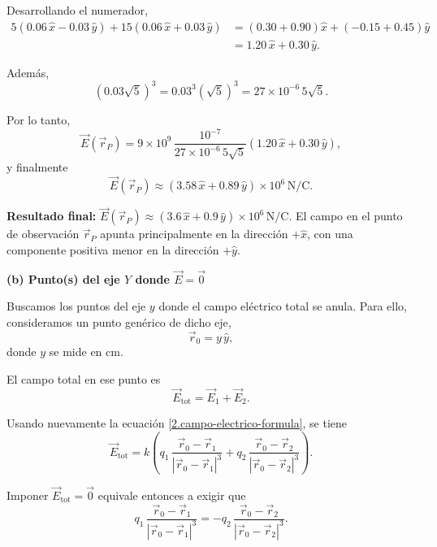 \documentclass[11pt]{article}
\newcommand{\resultadofinal}[1]{%
  \par\medskip
  \noindent\textbf{Resultado final:} #1\par
}
\begin{document}
Desarrollando el numerador,
\begin{align*}
5(0.06\,\hat x-0.03\,\hat y)
+
15(0.06\,\hat x+0.03\,\hat y)
&=
(0.30+0.90)\hat x+(-0.15+0.45)\hat y \\
&=
1.20\,\hat x+0.30\,\hat y.
\end{align*}

Además,
\begin{equation*}
(0.03\sqrt{5})^3
=
0.03^3(\sqrt{5})^3
=
27\times 10^{-6}\,5\sqrt{5}.
\end{equation*}

Por lo tanto,
\begin{equation*}
\vec E(\vec r_P)
=
9\times 10^9\,
\frac{10^{-7}}{27\times 10^{-6}\,5\sqrt{5}}
\left(1.20\,\hat x+0.30\,\hat y\right),
\end{equation*}
y finalmente
\begin{equation*}
\vec E(\vec r_P)
\approx
(3.58\,\hat x+0.89\,\hat y)\times 10^6\,\mathrm{N/C}.
\end{equation*}

\resultadofinal{$\boxed{\vec E(\vec r_P)\approx (3.6\,\hat x+0.9\,\hat y)\times 10^6\,\mathrm{N/C}.}$ El campo en el punto de observación $\vec r_P$ apunta principalmente en la dirección $+\hat x$, con una componente positiva menor en la dirección $+\hat y$.}

\newpage

\textbf{(b) Punto(s) del eje $Y$ donde $\vec E=\vec 0$}

Buscamos los puntos del eje $y$ donde el campo eléctrico total se anula. Para ello, consideramos un punto genérico de dicho eje,
\begin{equation*}
\vec r_0=y\,\hat y,
\end{equation*}
donde $y$ se mide en $\mathrm{cm}$.

El campo total en ese punto es
\begin{equation}\label{2.b.superposicion}
\vec E_{\mathrm{tot}}=\vec E_1+\vec E_2.
\end{equation}

Usando nuevamente la ecuación \eqref{2.campo-electrico-formula}, se tiene
\begin{equation*}
\vec E_{\mathrm{tot}}=
k\left(
q_1\,\frac{\vec r_0-\vec r_1}{|\vec r_0-\vec r_1|^3}
+
q_2\,\frac{\vec r_0-\vec r_2}{|\vec r_0-\vec r_2|^3}
\right).
\end{equation*}

Imponer $\vec E_{\mathrm{tot}}=\vec 0$ equivale entonces a exigir que
\begin{equation}\label{2.b.condicion-vectorial}
q_1\,\frac{\vec r_0-\vec r_1}{|\vec r_0-\vec r_1|^3}
=-q_2\,\frac{\vec r_0-\vec r_2}{|\vec r_0-\vec r_2|^3}.
\end{equation}
\end{document}
